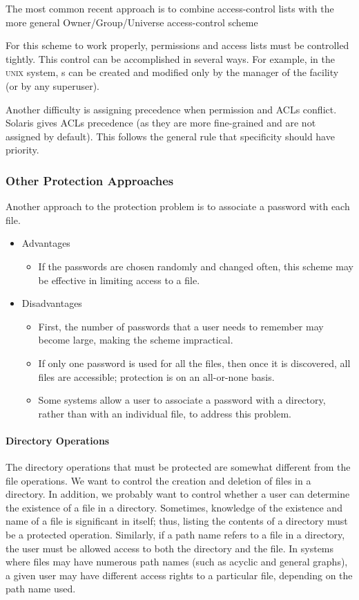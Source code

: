 The most common recent approach is to combine access-control lists with the more general Owner/Group/Universe access-control scheme

For this scheme to work properly, permissions and access lists must be controlled tightly.
This control can be accomplished in several ways.
For example, in the \textsc{unix} system, s can be created and modified only by the manager of the facility (or by any superuser).

Another difficulty is assigning precedence when permission and ACLs conflict.
Solaris gives ACLs precedence (as they are more fine-grained and are not assigned by default).
This follows the general rule that specificity should have priority.

\subsubsection{Other Protection Approaches}\label{subsubsec:Other_File_Protection_Approaches}
Another approach to the protection problem is to associate a password with each file.
\begin{itemize}[noitemsep]
\item Advantages
  \begin{itemize}[noitemsep]
  \item If the passwords are chosen randomly and changed often, this scheme may be effective in limiting access to a file.
  \end{itemize}
\item Disadvantages
  \begin{itemize}[noitemsep]
  \item First, the number of passwords that a user needs to remember may become large, making the scheme impractical.
  \item If only one password is used for all the files, then once it is discovered, all files are accessible; protection is on an all-or-none basis.
  \item Some systems allow a user to associate a password with a directory, rather than with an individual file, to address this problem.
  \end{itemize}
\end{itemize}

\paragraph{Directory Operations}\label{par:Directory_Operation_Protections}
The directory operations that must be protected are somewhat different from the file operations.
We want to control the creation and deletion of files in a directory.
In addition, we probably want to control whether a user can determine the existence of a file in a directory.
Sometimes, knowledge of the existence and name of a file is significant in itself; thus, listing the contents of a directory must be a protected operation.
Similarly, if a path name refers to a file in a directory, the user must be allowed access to both the directory and the file.
In systems where files may have numerous path names (such as acyclic and general graphs), a given user may have different access rights to a particular file, depending on the path name used.

